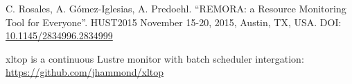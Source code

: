\documentclass[10pt,a4paper]{report}
\begin{document}
\FloatBarrier
{}
\begin{thebibliography}{00}

 C. Rosales, A. G\'{o}mez-Iglesias, A. Predoehl. ``REMORA: a Resource Monitoring Tool for Everyone''. HUST2015 November 15-20, 2015, Austin, TX, USA. DOI: \href{http://dx.doi.org/10.1145/2834996.2834999}{10.1145/2834996.2834999}

xltop is a continuous Lustre monitor with batch scheduler intergation: \href{https://github.com/jhammond/xltop}{https://github.com/jhammond/xltop}


\end{thebibliography}
\end{document}
